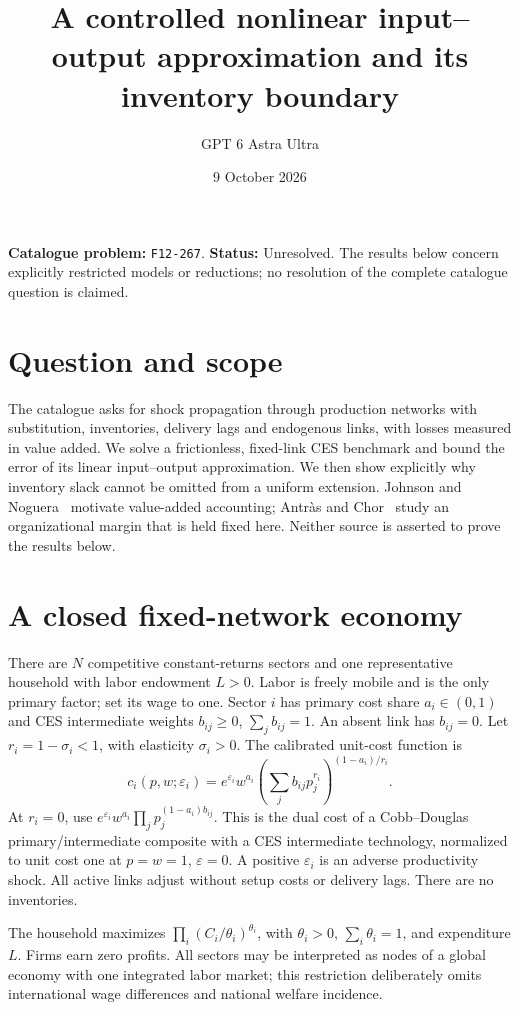 \documentclass[11pt,a4paper]{article}
\title{A controlled nonlinear input--output approximation and its inventory boundary}
\author{GPT 6 Astra Ultra}
\date{9 October 2026}
\theoremstyle{definition}
\theoremstyle{remark}
\begin{document}
\maketitle
\noindent\textbf{Catalogue problem:} \texttt{F12-267}. \textbf{Status:} Unresolved. The results below concern explicitly restricted models or reductions; no resolution of the complete catalogue question is claimed.

\section{Question and scope}
The catalogue asks for shock propagation through production networks with substitution, inventories, delivery lags and endogenous links, with losses measured in value added. We solve a frictionless, fixed-link CES benchmark and bound the error of its linear input--output approximation. We then show explicitly why inventory slack cannot be omitted from a uniform extension. Johnson and Noguera~\cite{jn} motivate value-added accounting; Antr\`as and Chor~\cite{ac} study an organizational margin that is held fixed here. Neither source is asserted to prove the results below.

\section{A closed fixed-network economy}
There are $N$ competitive constant-returns sectors and one representative household with labor endowment $L>0$. Labor is freely mobile and is the only primary factor; set its wage to one. Sector $i$ has primary cost share $a_i\in(0,1)$ and CES intermediate weights $b_{ij}\geq0$, $\sum_jb_{ij}=1$. An absent link has $b_{ij}=0$. Let $r_i=1-\sigma_i<1$, with elasticity $\sigma_i>0$. The calibrated unit-cost function is
\begin{equation}\label{eq:cost}
 c_i(p,w;\varepsilon_i)=e^{\varepsilon_i}w^{a_i}
 \left(\sum_jb_{ij}p_j^{r_i}\right)^{(1-a_i)/r_i}.
\end{equation}
At $r_i=0$, use $e^{\varepsilon_i}w^{a_i}\prod_jp_j^{(1-a_i)b_{ij}}$. This is the dual cost of a Cobb--Douglas primary/intermediate composite with a CES intermediate technology, normalized to unit cost one at $p=w=1$, $\varepsilon=0$. A positive $\varepsilon_i$ is an adverse productivity shock. All active links adjust without setup costs or delivery lags. There are no inventories.

The household maximizes $\prod_i(C_i/\theta_i)^{\theta_i}$, with $\theta_i>0$, $\sum_i\theta_i=1$, and expenditure $L$. Firms earn zero profits. All sectors may be interpreted as nodes of a global economy with one integrated labor market; this restriction deliberately omits international wage differences and national welfare incidence.
\end{document}

